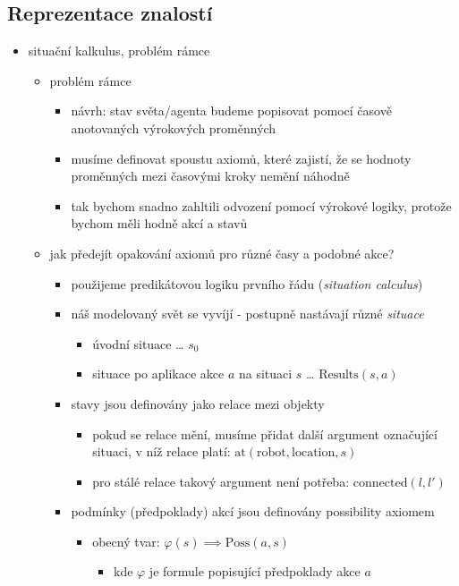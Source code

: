 \subsection{Reprezentace znalostí}
\begin{itemize}
\item situační kalkulus, problém rámce
\begin{itemize}
\item problém rámce
\begin{itemize}
\item návrh: stav světa/agenta budeme popisovat pomocí časově anotovaných výrokových proměnných
\item musíme definovat spoustu axiomů, které zajistí, že se hodnoty proměnných mezi časovými kroky nemění náhodně
\item tak bychom snadno zahltili odvození pomocí výrokové logiky, protože bychom měli hodně akcí a stavů
\end{itemize}
\item jak předejít opakování axiomů pro různé časy a podobné akce?
\begin{itemize}
\item použijeme predikátovou logiku prvního řádu (\textit{situation calculus})
\item náš modelovaný svět se vyvíjí - postupně nastávají různé \textit{situace}
\begin{itemize}
\item úvodní situace \dots{} $s_0$
\item situace po aplikace akce $a$ na situaci $s$ \dots{} $\text{Results}(s,a)$
\end{itemize}
\item stavy jsou definovány jako relace mezi objekty
\begin{itemize}
\item pokud se relace mění, musíme přidat další argument označující situaci, v níž relace platí: $\mathrm{at}(\mathrm{robot}, \mathrm{location}, s)$
\item pro stálé relace takový argument není potřeba: $\mathrm{connected}(l, l')$
\end{itemize}
\item podmínky (předpoklady) akcí jsou definovány possibility axiomem
\begin{itemize}
\item obecný tvar: $\varphi(s)\implies \text{Poss}(a,s)$
\begin{itemize}
\item kde $\varphi$ je formule popisující předpoklady akce $a$

\end{itemize}
\end{itemize}
\end{itemize}
\end{itemize}
\end{itemize}
